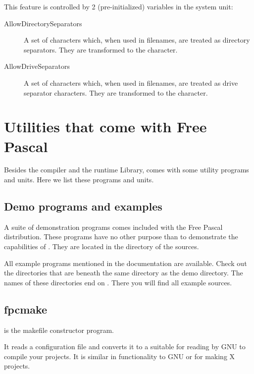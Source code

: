 This feature is controlled by 2 (pre-initialized) variables in the system unit:
\begin{description}
\item[AllowDirectorySeparators] A set of characters which, when used in
filenames, are treated as directory separators. They are transformed to
the  character.
\item[AllowDriveSeparators] A set of characters which, when used in
filenames, are treated as drive separator characters. They are transformed
to the  character.
\end{description}


\chapter{Utilities that come with Free Pascal}
\label{ch:Utilities}
Besides the compiler and the runtime Library, \fpc comes with some utility
programs and units. Here we list these programs and units.

\section{Demo programs and examples}
A suite of demonstration programs comes included with the Free
Pascal distribution.
These programs have no other purpose than to demonstrate the capabilities of
\fpc. They are located in the  directory of the sources.

All example programs mentioned in the documentation are available. Check out the
directories that are beneath the same directory as the demo directory.
The names of these directories end on .
There you will find all example sources.

\section{fpcmake}

 is the \fpc makefile constructor program.

It reads a  configuration file and converts it to a
 suitable for reading by GNU  to compile
your projects. It is similar in functionality to GNU 
or  for making X projects.

